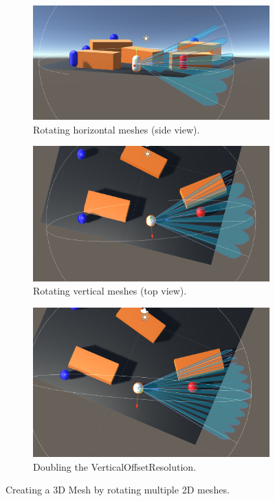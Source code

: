 \documentclass{article}
\begin{document}
\begin{figure}
\centering
\begin{subfigure}[b]{1\textwidth}
   \centering
   \includegraphics[width=0.8\linewidth]{FOV(11).png}
   \caption{Rotating horizontal meshes (side view).}
\end{subfigure}
\begin{subfigure}[b]{1\textwidth}
   \centering
   \includegraphics[width=0.8\linewidth]{FOV(12).png}
   \caption{Rotating vertical meshes (top view).}
\end{subfigure}
\begin{subfigure}[c]{1\textwidth}
   \centering
   \includegraphics[width=0.8\linewidth]{FOV(13).png}
   \caption{Doubling the VerticalOffsetResolution.}
\end{subfigure}
\caption[]{Creating a 3D Mesh by rotating multiple 2D meshes.}
\end{figure}
\end{document}
